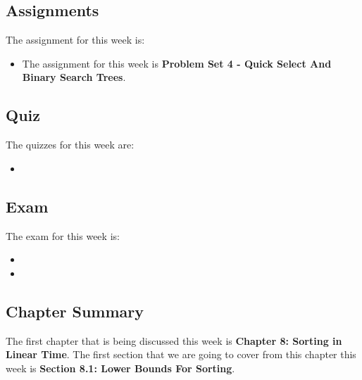\subsection{Assignments}

The assignment for this week is:

\begin{itemize}
    \item The assignment for this week is \textbf{Problem Set 4 - Quick Select And Binary Search Trees}. 
\end{itemize}

\subsection{Quiz}

The quizzes for this week are:

\begin{itemize}
    \item {} \textbullet {} 
\end{itemize}

\subsection{Exam}

The exam for this week is:

\begin{itemize}
    \item {}
    \item {} \textbullet {} 
\end{itemize}

\subsection{Chapter Summary}

The first chapter that is being discussed this week is \textbf{Chapter 8: Sorting in Linear Time}. The first section that we are going to cover from this chapter this week is \textbf{Section 8.1: Lower Bounds For Sorting}.


